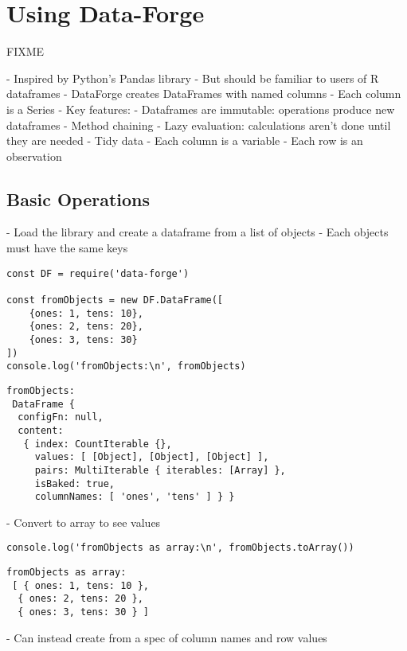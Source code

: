 \chapter{Using Data-Forge}\label{s:dataforge}

FIXME

-   Inspired by Python's Pandas library
    -   But should be familiar to users of R dataframes
-   DataForge creates DataFrames with named columns
-   Each column is a Series
-   Key features:
    -   Dataframes are immutable: operations produce new dataframes
    -   Method chaining
    -   Lazy evaluation: calculations aren't done until they are needed
-   Tidy data
    -   Each column is a variable
    -   Each row is an observation
    
\section{Basic Operations}\label{s:dataforge-basics}

-   Load the library and create a dataframe from a list of objects
    -   Each objects must have the same keys

\begin{verbatim}
const DF = require('data-forge')

const fromObjects = new DF.DataFrame([
    {ones: 1, tens: 10},
    {ones: 2, tens: 20},
    {ones: 3, tens: 30}
])
console.log('fromObjects:\n', fromObjects)
\end{verbatim}

\begin{verbatim}
fromObjects:
 DataFrame {
  configFn: null,
  content:
   { index: CountIterable {},
     values: [ [Object], [Object], [Object] ],
     pairs: MultiIterable { iterables: [Array] },
     isBaked: true,
     columnNames: [ 'ones', 'tens' ] } }
\end{verbatim}

-   Convert to array to see values

\begin{verbatim}
console.log('fromObjects as array:\n', fromObjects.toArray())
\end{verbatim}

\begin{verbatim}
fromObjects as array:
 [ { ones: 1, tens: 10 },
  { ones: 2, tens: 20 },
  { ones: 3, tens: 30 } ]
\end{verbatim}

-   Can instead create from a spec of column names and row values

